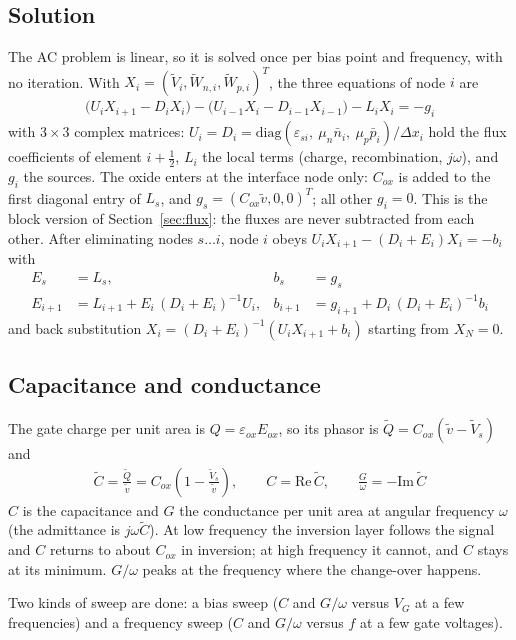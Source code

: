 \documentclass[11pt]{article}
\newcommand{\half}{\tfrac{1}{2}}
\begin{document}
\subsection{Solution}\label{sec:block}
The AC problem is linear, so it is solved once per bias point and frequency, with no iteration. With
$X_i=(\tilde V_i,\tilde W_{n,i},\tilde W_{p,i})^T$, the three equations of node $i$ are
\begin{align}
\big(U_iX_{i+1}-D_iX_i\big)-\big(U_{i-1}X_i-D_{i-1}X_{i-1}\big)-L_iX_i=-g_i
\end{align}
with $3\times3$ complex matrices: $U_i=D_i=\mathrm{diag}\!\left(\varepsilon_{si},\ \mu_n\bar n_i,\ \mu_p\bar p_i\right)/\Delta x_i$
hold the flux coefficients of element $i+\half$, $L_i$ the local terms (charge, recombination, $j\omega$),
and $g_i$ the sources. The oxide enters at the interface node only: $C_{ox}$ is added to the first diagonal
entry of $L_s$, and $g_s=(C_{ox}\tilde v,0,0)^T$; all other $g_i=0$.
This is the block version of Section~\ref{sec:flux}: the fluxes are never subtracted from each
other. After eliminating nodes $s\dots i$, node $i$ obeys $U_iX_{i+1}-(D_i+E_i)X_i=-b_i$ with
\begin{align}
E_s&=L_s, & b_s&=g_s\\
E_{i+1}&=L_{i+1}+E_i\,(D_i+E_i)^{-1}U_i, & b_{i+1}&=g_{i+1}+D_i\,(D_i+E_i)^{-1}b_i
\end{align}
and back substitution $X_i=(D_i+E_i)^{-1}\left(U_iX_{i+1}+b_i\right)$ starting from $X_N=0$.

\subsection{Capacitance and conductance}
The gate charge per unit area is $Q=\varepsilon_{ox}E_{ox}$, so its phasor is
$\tilde Q=C_{ox}(\tilde v-\tilde V_s)$ and
\begin{align}
\tilde C=\frac{\tilde Q}{\tilde v}=C_{ox}\left(1-\frac{\tilde V_s}{\tilde v}\right),\qquad
C=\mathrm{Re}\,\tilde C,\qquad \frac{G}{\omega}=-\mathrm{Im}\,\tilde C
\end{align}
$C$ is the capacitance and $G$ the conductance per unit area at angular frequency $\omega$ (the admittance
is $j\omega\tilde C$). At low frequency the inversion layer follows the signal and $C$ returns to about
$C_{ox}$ in inversion; at high frequency it cannot, and $C$ stays at its minimum. $G/\omega$ peaks at the
frequency where the change-over happens.

Two kinds of sweep are done: a bias sweep ($C$ and $G/\omega$ versus $V_G$ at a few
frequencies) and a frequency sweep ($C$ and $G/\omega$ versus $f$ at a few gate voltages).
\end{document}
